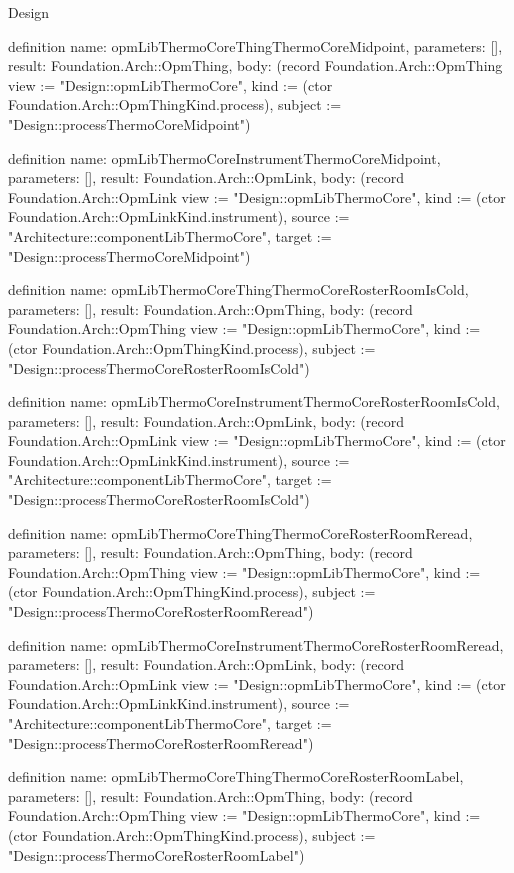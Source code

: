 \begin{lexlean}{Design}
\begin{semanticmodule}
definition{
  name: opmLibThermoCoreThingThermoCoreMidpoint,
  parameters: [],
  result: Foundation.Arch::OpmThing,
  body: (record Foundation.Arch::OpmThing {view := "Design::opmLibThermoCore", kind := (ctor Foundation.Arch::OpmThingKind.process), subject := "Design::processThermoCoreMidpoint"})
}

definition{
  name: opmLibThermoCoreInstrumentThermoCoreMidpoint,
  parameters: [],
  result: Foundation.Arch::OpmLink,
  body: (record Foundation.Arch::OpmLink {view := "Design::opmLibThermoCore", kind := (ctor Foundation.Arch::OpmLinkKind.instrument), source := "Architecture::componentLibThermoCore", target := "Design::processThermoCoreMidpoint"})
}

definition{
  name: opmLibThermoCoreThingThermoCoreRosterRoomIsCold,
  parameters: [],
  result: Foundation.Arch::OpmThing,
  body: (record Foundation.Arch::OpmThing {view := "Design::opmLibThermoCore", kind := (ctor Foundation.Arch::OpmThingKind.process), subject := "Design::processThermoCoreRosterRoomIsCold"})
}

definition{
  name: opmLibThermoCoreInstrumentThermoCoreRosterRoomIsCold,
  parameters: [],
  result: Foundation.Arch::OpmLink,
  body: (record Foundation.Arch::OpmLink {view := "Design::opmLibThermoCore", kind := (ctor Foundation.Arch::OpmLinkKind.instrument), source := "Architecture::componentLibThermoCore", target := "Design::processThermoCoreRosterRoomIsCold"})
}

definition{
  name: opmLibThermoCoreThingThermoCoreRosterRoomReread,
  parameters: [],
  result: Foundation.Arch::OpmThing,
  body: (record Foundation.Arch::OpmThing {view := "Design::opmLibThermoCore", kind := (ctor Foundation.Arch::OpmThingKind.process), subject := "Design::processThermoCoreRosterRoomReread"})
}

definition{
  name: opmLibThermoCoreInstrumentThermoCoreRosterRoomReread,
  parameters: [],
  result: Foundation.Arch::OpmLink,
  body: (record Foundation.Arch::OpmLink {view := "Design::opmLibThermoCore", kind := (ctor Foundation.Arch::OpmLinkKind.instrument), source := "Architecture::componentLibThermoCore", target := "Design::processThermoCoreRosterRoomReread"})
}

definition{
  name: opmLibThermoCoreThingThermoCoreRosterRoomLabel,
  parameters: [],
  result: Foundation.Arch::OpmThing,
  body: (record Foundation.Arch::OpmThing {view := "Design::opmLibThermoCore", kind := (ctor Foundation.Arch::OpmThingKind.process), subject := "Design::processThermoCoreRosterRoomLabel"})
}


\end{semanticmodule}
\end{lexlean}
